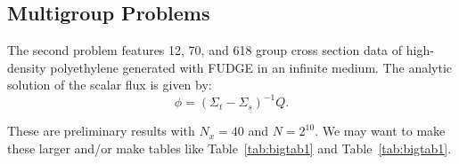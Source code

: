 
\subsection{Multigroup Problems}

The second problem features 12, 70, and 618 group cross section data of high-density polyethylene generated with FUDGE \cite{mattoon2012generalized} in an infinite medium.  The analytic solution of the scalar flux is given by:
\begin{equation}
    \phi = (\Sigma_t - \Sigma_s)^{-1}Q.
\end{equation}

These are preliminary results with $N_x = 40$ and $N=2^{10}$. We may want to make these larger and/or make tables like  Table~\ref{tab:bigtab1} and Table~\ref{tab:bigtab1}. 


